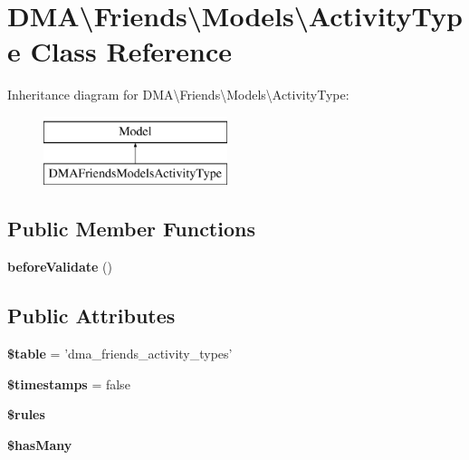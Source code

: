 \hypertarget{classDMA_1_1Friends_1_1Models_1_1ActivityType}{\section{D\-M\-A\textbackslash{}Friends\textbackslash{}Models\textbackslash{}Activity\-Type Class Reference}
\label{classDMA_1_1Friends_1_1Models_1_1ActivityType}
}
Inheritance diagram for D\-M\-A\textbackslash{}Friends\textbackslash{}Models\textbackslash{}Activity\-Type\-:\begin{figure}[H]
\begin{center}
\leavevmode
\includegraphics[height=2.000000cm]{d6/d9b/classDMA_1_1Friends_1_1Models_1_1ActivityType}
\end{center}
\end{figure}
\subsection*{Public Member Functions}
\begin{DoxyCompactItemize}
\item 
\hypertarget{classDMA_1_1Friends_1_1Models_1_1ActivityType_a83d0835e12b070150ef95a37a4c2ca03}{{\bfseries before\-Validate} ()}\label{classDMA_1_1Friends_1_1Models_1_1ActivityType_a83d0835e12b070150ef95a37a4c2ca03}

\end{DoxyCompactItemize}
\subsection*{Public Attributes}
\begin{DoxyCompactItemize}
\item 
\hypertarget{classDMA_1_1Friends_1_1Models_1_1ActivityType_a439a95f54467ed98c4db4e130c37b733}{{\bfseries \$table} = 'dma\-\_\-friends\-\_\-activity\-\_\-types'}\label{classDMA_1_1Friends_1_1Models_1_1ActivityType_a439a95f54467ed98c4db4e130c37b733}

\item 
\hypertarget{classDMA_1_1Friends_1_1Models_1_1ActivityType_acf0a62230181f0a541aba2e335df5db7}{{\bfseries \$timestamps} = false}\label{classDMA_1_1Friends_1_1Models_1_1ActivityType_acf0a62230181f0a541aba2e335df5db7}

\item 
{\bfseries \$rules}
\item 
{\bfseries \$has\-Many}
\end{DoxyCompactItemize}
